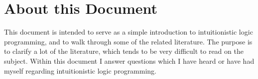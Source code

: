 \section{About this Document}

This document is intended to serve as a simple introduction to intuitionistic logic programming, and to walk through some of the related literature.
The purpose is to clarify a lot of the literature, which tends to be very difficult to read on the subject.
Within this document I answer questions which I have heard or have had myself regarding intuitionistic logic programming.
